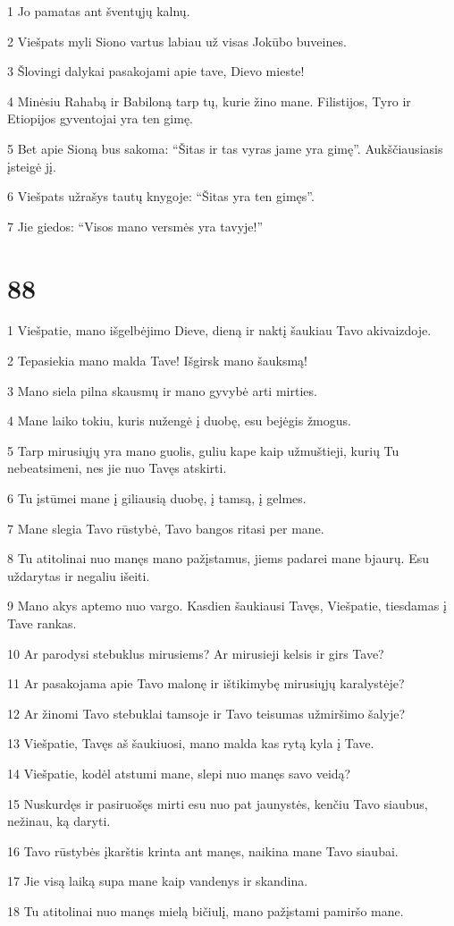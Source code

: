 \par 1 Jo pamatas ant šventųjų kalnų. 
\par 2 Viešpats myli Siono vartus labiau už visas Jokūbo buveines. 
\par 3 Šlovingi dalykai pasakojami apie tave, Dievo mieste! 
\par 4 Minėsiu Rahabą ir Babiloną tarp tų, kurie žino mane. Filistijos, Tyro ir Etiopijos gyventojai yra ten gimę. 
\par 5 Bet apie Sioną bus sakoma: “Šitas ir tas vyras jame yra gimę”. Aukščiausiasis įsteigė jį. 
\par 6 Viešpats užrašys tautų knygoje: “Šitas yra ten gimęs”. 
\par 7 Jie giedos: “Visos mano versmės yra tavyje!”


\chapter{88}


\par 1 Viešpatie, mano išgelbėjimo Dieve, dieną ir naktį šaukiau Tavo akivaizdoje. 
\par 2 Tepasiekia mano malda Tave! Išgirsk mano šauksmą! 
\par 3 Mano siela pilna skausmų ir mano gyvybė arti mirties. 
\par 4 Mane laiko tokiu, kuris nužengė į duobę, esu bejėgis žmogus. 
\par 5 Tarp mirusiųjų yra mano guolis, guliu kape kaip užmuštieji, kurių Tu nebeatsimeni, nes jie nuo Tavęs atskirti. 
\par 6 Tu įstūmei mane į giliausią duobę, į tamsą, į gelmes. 
\par 7 Mane slegia Tavo rūstybė, Tavo bangos ritasi per mane. 
\par 8 Tu atitolinai nuo manęs mano pažįstamus, jiems padarei mane bjaurų. Esu uždarytas ir negaliu išeiti. 
\par 9 Mano akys aptemo nuo vargo. Kasdien šaukiausi Tavęs, Viešpatie, tiesdamas į Tave rankas. 
\par 10 Ar parodysi stebuklus mirusiems? Ar mirusieji kelsis ir girs Tave? 
\par 11 Ar pasakojama apie Tavo malonę ir ištikimybę mirusiųjų karalystėje? 
\par 12 Ar žinomi Tavo stebuklai tamsoje ir Tavo teisumas užmiršimo šalyje? 
\par 13 Viešpatie, Tavęs aš šaukiuosi, mano malda kas rytą kyla į Tave. 
\par 14 Viešpatie, kodėl atstumi mane, slepi nuo manęs savo veidą? 
\par 15 Nuskurdęs ir pasiruošęs mirti esu nuo pat jaunystės, kenčiu Tavo siaubus, nežinau, ką daryti. 
\par 16 Tavo rūstybės įkarštis krinta ant manęs, naikina mane Tavo siaubai. 
\par 17 Jie visą laiką supa mane kaip vandenys ir skandina. 
\par 18 Tu atitolinai nuo manęs mielą bičiulį, mano pažįstami pamiršo mane.


